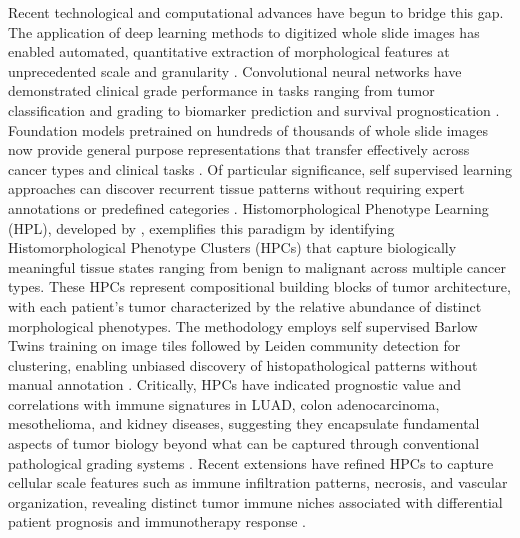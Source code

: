 \documentclass[pdflatex,article,12pt]{article}
\begin{document}
Recent technological and computational advances have begun to bridge this gap. The application of deep learning methods to digitized whole slide images has enabled automated, quantitative extraction of morphological features at unprecedented scale and granularity \cite{campanella2019clinical,komura2024machine}. Convolutional neural networks have demonstrated clinical grade performance in tasks ranging from tumor classification and grading to biomarker prediction and survival prognostication \cite{campanella2019clinical,mobadersany2018predicting,tsai2023histopathology}. Foundation models pretrained on hundreds of thousands of whole slide images now provide general purpose representations that transfer effectively across cancer types and clinical tasks \cite{chen2024towards,xu2024whole,wang2025multimodal}. Of particular significance, self supervised learning approaches can discover recurrent tissue patterns without requiring expert annotations or predefined categories \cite{ciga2022self,koohbanani2021self}. Histomorphological Phenotype Learning (HPL), developed by \cite{claudio2024mapping}, exemplifies this paradigm by identifying Histomorphological Phenotype Clusters (HPCs) that capture biologically meaningful tissue states ranging from benign to malignant across multiple cancer types. These HPCs represent compositional building blocks of tumor architecture, with each patient's tumor characterized by the relative abundance of distinct morphological phenotypes. The methodology employs self supervised Barlow Twins training on image tiles followed by Leiden community detection for clustering, enabling unbiased discovery of histopathological patterns without manual annotation \cite{claudio2024mapping,dalmia2024self,li2024self}. Critically, HPCs have indicated prognostic value and correlations with immune signatures in LUAD, colon adenocarcinoma, mesothelioma, and kidney diseases, suggesting they encapsulate fundamental aspects of tumor biology beyond what can be captured through conventional pathological grading systems \cite{claudio2024mapping,dalmia2024self,vanea2025self,fernandez2025unbiased}. Recent extensions have refined HPCs to capture cellular scale features such as immune infiltration patterns, necrosis, and vascular organization, revealing distinct tumor immune niches associated with differential patient prognosis and immunotherapy response \cite{li2025contrastive}.
\end{document}
